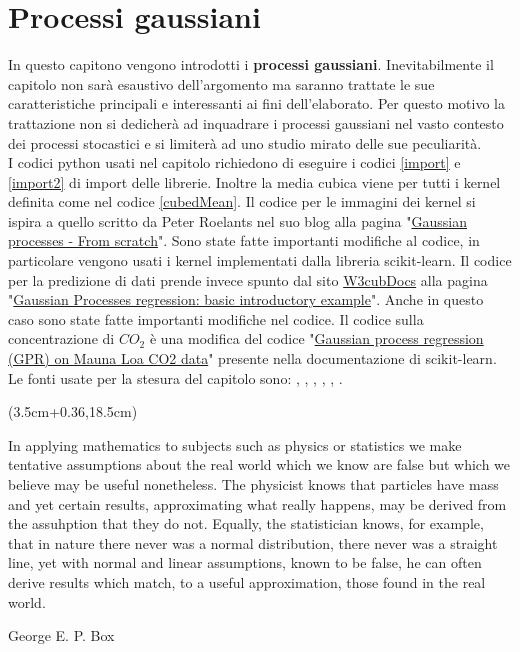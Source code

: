 \chapter{Processi gaussiani}\label{gaussianProcessChapter}
In questo capitono vengono introdotti i \textbf{processi gaussiani}. Inevitabilmente il capitolo non sarà esaustivo dell'argomento ma saranno trattate le sue caratteristiche principali e interessanti ai fini dell'elaborato. Per questo motivo la trattazione non si dedicherà ad inquadrare i processi gaussiani nel vasto contesto dei processi stocastici e si limiterà ad uno studio mirato delle sue peculiarità.\\
I codici python usati nel capitolo richiedono di eseguire i codici \ref{import} e \ref{import2} di import delle librerie. Inoltre la media cubica viene per tutti i kernel definita come nel codice \ref{cubedMean}. 
Il codice per le immagini dei kernel si ispira a quello scritto da Peter Roelants nel suo blog alla pagina "\href{https://peterroelants.github.io/posts/gaussian-process-tutorial/#Gaussian-processes-(1/3)---From-scratch}{Gaussian processes - From scratch}". Sono state fatte importanti modifiche al codice, in particolare vengono usati i kernel implementati dalla libreria scikit-learn.
Il codice per la predizione di dati prende invece spunto dal sito  \href{https://docs.w3cub.com/about/}{W3cubDocs} alla pagina "\href{https://docs.w3cub.com/scikit_learn/auto_examples/gaussian_process/plot_gpr_noisy_targets}{Gaussian Processes regression: basic introductory example}". Anche in questo caso sono state fatte importanti modifiche nel codice.
Il codice sulla concentrazione di $CO_2$ è una modifica del codice "\href{https://scikit-learn.org/stable/auto_examples/gaussian_process/plot_gpr_co2.html}{Gaussian process regression (GPR) on Mauna Loa CO2 data}" presente nella documentazione di scikit-learn.\\
Le fonti usate per la stesura del capitolo sono: \cite{rasmussen_gaussian_2006}, \cite{murphy_probabilistic_2022}, \cite{rasmussen_gaussian_2004}, \cite{duvenaud_automatic_2014}, \cite{gortler_visual_2019}, \cite{murphy_machine_2012}.


\begin{textblock*}{0.64\textwidth}(3.5cm+0.36\textwidth,18.5cm)
\epigraph{In applying mathematics to subjects such as physics
or statistics we make tentative assumptions about the
real world which we know are false but which we believe
may be useful nonetheless. The physicist knows that
particles have mass and yet certain results, approximating
what really happens, may be derived from the assuhption that they do not. Equally, the statistician knows, for
example, that in nature there never was a normal distribution, there never was a straight line, yet with normal and
linear assumptions, known to be false, he can often derive
results which match, to a useful approximation, those
found in the real world.}{George E. P. Box}
\end{textblock*}

